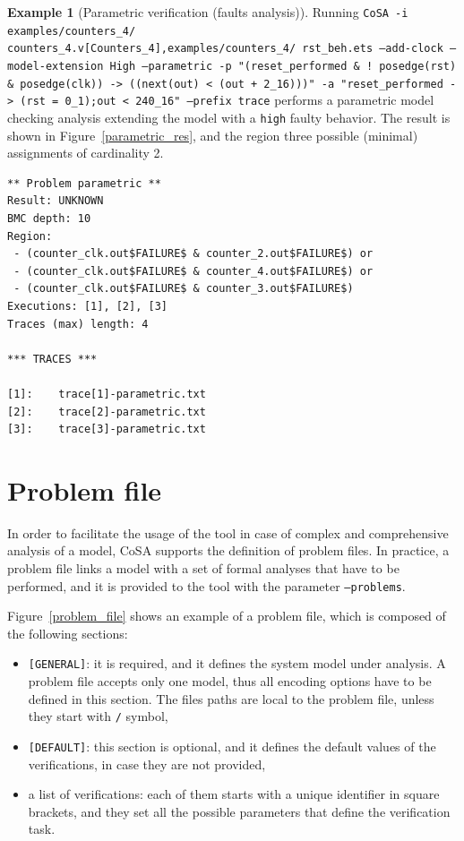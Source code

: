 \documentclass{article}
\theoremstyle{definition}
\newtheorem{example}{Example}[section]
\begin{document}
\begin{example}[Parametric verification (faults analysis)]
\label{ex:param_extended}
  Running \texttt{CoSA -i
    examples/counters\_4/\\counters\_4.v[Counters\_4],examples/counters\_4/
    rst\_beh.ets --add-clock --model-extension High --parametric -p
    "(reset\_performed \& ! posedge(rst) \& posedge(clk))
    -> ((next(out) < (out + 2\_16)))" -a "reset\_performed -> (rst =
    0\_1);out < 240\_16" --prefix trace} performs a parametric model
  checking analysis extending the model with a \texttt{high} faulty
  behavior. The result is shown in Figure~\ref{parametric_res}, and
  the region three possible (minimal) assignments of cardinality 2.

\begin{lstlisting}[frame=single,language=ets,caption=Parametric analysis example,label=parametric_res]
** Problem parametric **
Result: UNKNOWN
BMC depth: 10
Region:
 - (counter_clk.out$FAILURE$ & counter_2.out$FAILURE$) or 
 - (counter_clk.out$FAILURE$ & counter_4.out$FAILURE$) or 
 - (counter_clk.out$FAILURE$ & counter_3.out$FAILURE$)
Executions: [1], [2], [3]
Traces (max) length: 4

*** TRACES ***

[1]:	trace[1]-parametric.txt
[2]:	trace[2]-parametric.txt
[3]:	trace[3]-parametric.txt
\end{lstlisting}

\end{example}

\section{Problem file}
\label{sec:problem_file}

In order to facilitate the usage of the tool in case of complex and
comprehensive analysis of a model, CoSA supports the definition of
problem files. In practice, a problem file links a model with a set of
formal analyses that have to be performed, and it is provided to the
tool with the parameter \texttt{--problems}.

Figure~\ref{problem_file} shows an example of a problem file, which is
composed of the following sections:
\begin{itemize}
\item \texttt{[GENERAL]}: it is required, and it defines the system
  model under analysis. A problem file accepts only one model, thus
  all encoding options have to be defined in this section. The files
  paths are local to the problem file, unless they start with
  \texttt{/} symbol,
\item \texttt{[DEFAULT]}: this section is optional, and it defines the
  default values of the verifications, in case they are not provided,
\item a list of verifications: each of them starts with a unique
  identifier in square brackets, and they set all the possible
  parameters that define the verification task.
\end{itemize}
\end{document}
